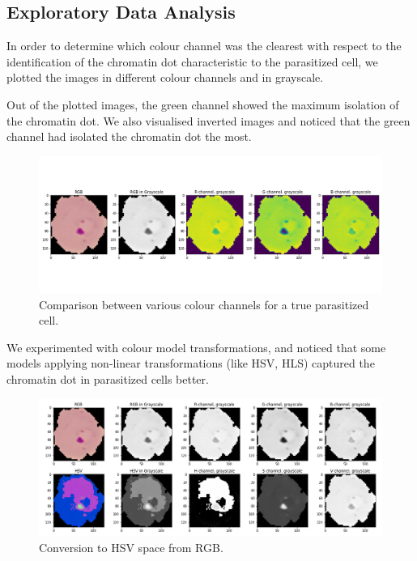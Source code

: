 \documentclass[10pt,twocolumn,letterpaper]{article}
\begin{document}
\subsection{Exploratory Data Analysis}
In order to determine which colour channel was the clearest with respect to the identification of the chromatin dot characteristic to the parasitized cell, we plotted the images in different colour channels and in grayscale.

Out of the plotted images, the green channel showed the maximum isolation of the chromatin dot. We also visualised inverted images and noticed that the green channel had isolated the chromatin dot the most.
\begin{figure}[t]
   \begin{center}
      \includegraphics[width=1\linewidth]{../Plots/Comparison between channels.png}
   \end{center}
      \caption{Comparison between various colour channels for a true parasitized cell.}
   \label{fig:channel_comparison}
\end{figure}

We experimented with colour model transformations, and noticed that some models applying non-linear transformations (like HSV, HLS) captured the chromatin dot in parasitized cells better.

\begin{figure}[t]
   \begin{center}
      \includegraphics[width=1\linewidth]{../Plots/hsv_conversion.png}
   \end{center}
      \caption{Conversion to HSV space from RGB.}
   \label{fig:HSV_space}
\end{figure}
\end{document}
